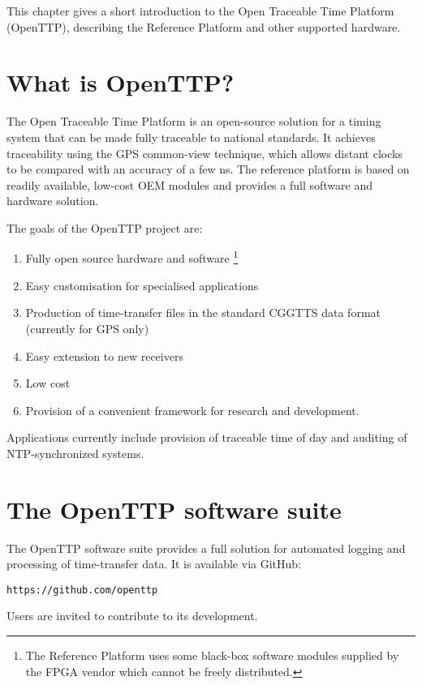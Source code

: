 


This chapter gives a short introduction to the Open Traceable Time Platform (OpenTTP), describing the Reference Platform and other supported hardware.

\section{What is OpenTTP?}

The Open Traceable Time Platform is an open-source solution for a timing system that can be made fully traceable to national standards.
It achieves traceability using the GPS common-view technique, which allows distant clocks to be compared with an accuracy of a few ns.
The reference platform is based on readily available, low-cost OEM modules and provides a full software and hardware solution. 

The goals of the OpenTTP project are:
\begin{enumerate}

	\item Fully open source hardware and software 
		\footnote{The Reference Platform uses some black-box software modules supplied by the FPGA vendor which cannot be freely distributed.}
	
	\item Easy customisation for specialised applications
	
	\item Production of time-transfer files in the standard CGGTTS data format 
		(currently for GPS only)
	
	\item Easy extension to new receivers

	\item Low cost
	
	\item Provision of a convenient framework for research and development.

\end{enumerate}

Applications currently include provision of traceable time of day and auditing of NTP-synchronized systems.

\section{The OpenTTP software suite}

The OpenTTP software suite provides a full solution for automated logging and processing of time-transfer data.
It is available via GitHub:
\begin{lstlisting}
https://github.com/openttp
\end{lstlisting}
Users are invited to contribute to its development.

